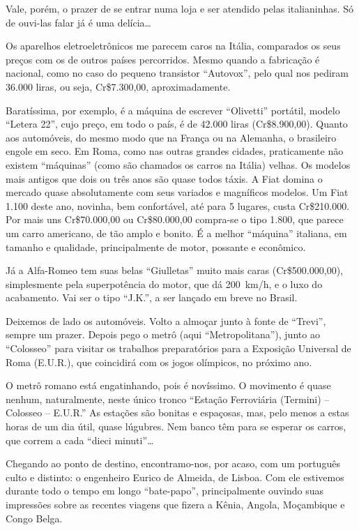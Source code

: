 Vale, porém, o prazer de se entrar numa loja e ser atendido pelas italianinhas. Só de ouvi-las falar já é uma delícia\ldots

Os aparelhos eletroeletrônicos me parecem caros na Itália, comparados os seus preços com os de outros países percorridos. Mesmo quando a fabricação é nacional, como no caso do pequeno transistor ``Autovox'', pelo qual nos pediram 36.000 liras, ou seja, Cr\$7.300,00, aproximadamente.

Baratíssima, por exemplo, é a máquina de escrever ``Olivetti'' portátil, modelo ``Letera 22'', cujo preço, em todo o país, é de 42.000 liras (Cr\$8.900,00). Quanto aos automóveis, do mesmo modo que na França ou na Alemanha, o brasileiro engole em seco. Em Roma, como nas outras grandes cidades, praticamente não existem ``máquinas'' (como são chamados os carros na Itália) velhas. Os modelos mais antigos que dois ou três anos são quase todos táxis. A Fiat domina o mercado quase absolutamente com seus variados e magníficos modelos. Um Fiat 1.100 deste ano, novinha, bem confortável, até para 5 lugares, custa Cr\$210.000. Por mais uns Cr\$70.000,00 ou Cr\$80.000,00 compra-se o tipo 1.800, que parece um carro americano, de tão amplo e bonito. É a melhor ``máquina'' italiana, em tamanho e qualidade, principalmente de motor, possante e econômico.

Já a Alfa-Romeo tem suas belas ``Giulletas'' muito mais caras (Cr\$500.000,00), simplesmente pela superpotência do motor, que dá 200~km/h, e o luxo do acabamento. Vai ser o tipo ``J.K.'', a ser lançado em breve no Brasil.

Deixemos de lado os automóveis. Volto a almoçar junto à fonte de ``Trevi'', sempre um prazer. Depois pego o metrô (aqui ``Metropolitana''), junto ao ``Colosseo'' para visitar os trabalhos preparatórios para a Exposição Universal de Roma (E.U.R.), que coincidirá com os jogos olímpicos, no próximo ano.

O metrô romano está engatinhando, pois é novíssimo. O movimento é quase nenhum, naturalmente, neste único tronco ``Estação Ferroviária (Termini) -- Colosseo -- E.U.R.'' As estações são bonitas e espaçosas, mas, pelo menos a estas horas de um dia útil, quase lúgubres. Nem banco têm para se esperar os carros, que correm a cada ``dieci minuti''\ldots

Chegando ao ponto de destino, encontramo-nos, por acaso, com um português culto e distinto: o engenheiro Eurico de Almeida, de Lisboa. Com ele estivemos durante todo o tempo em longo ``bate-papo'', principalmente ouvindo suas impressões sobre as recentes viagens que fizera a Kênia, Angola, Moçambique e Congo Belga.

